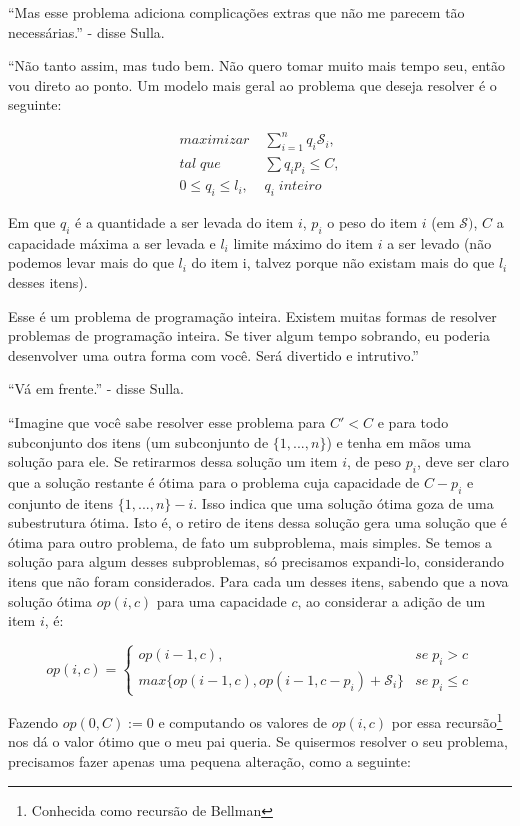 \documentclass{article}
\begin{document}
``Mas esse problema adiciona complicações extras que não me parecem tão necessárias.'' - disse
Sulla.

``Não tanto assim, mas tudo bem. Não quero tomar muito mais tempo seu, então vou direto ao ponto. Um
modelo mais geral ao problema que deseja resolver é o seguinte:

\begin{align*}
  maximizar \;& \sum\limits_{i=1}^n q_i \mathscr{S}_i,\\
  tal\; que\;& \sum{q_i p_i} \leq C,\\
  0 \leq q_i \leq l_i,\; & q_i \; inteiro
\end{align*}

Em que $q_i$ é a quantidade a ser levada do item $i$, $p_i$ o peso do item $i$ (em
$\mathscr{S})$, $C$ a capacidade máxima a ser levada e $l_i$ limite máximo do item $i$ a ser
levado (não podemos levar mais do que $l_i$ do item i, talvez porque não existam mais do que $l_i$
desses itens).

Esse é um problema de programação inteira. Existem muitas formas de resolver problemas de
programação inteira. Se tiver algum tempo sobrando, eu poderia desenvolver uma outra forma com
você. Será divertido e intrutivo.''

``Vá em frente.'' - disse Sulla.

``Imagine que você sabe resolver esse problema para $C' < C$ e para todo subconjunto dos itens (um
subconjunto de $\{1, ..., n\}$) e tenha em mãos uma solução para ele. Se retirarmos dessa solução um item $i$, de peso $p_i$, deve ser
claro que a solução restante é ótima para o problema cuja capacidade de $C - p_i$ e conjunto de
itens $\{1, ..., n\}-i$. Isso indica que uma solução ótima goza de uma subestrutura ótima. Isto é, o
retiro de itens dessa solução gera uma solução que é ótima para outro problema, de fato um
subproblema, mais simples. Se temos a solução para algum desses subproblemas, só precisamos
expandi-lo, considerando itens que não foram considerados. Para cada um desses itens, sabendo que a
nova solução ótima $op(i,c)$ para uma capacidade $c$, ao considerar a adição de um item $i$, é:

\[
  op(i,c) =
  \begin{cases}
    op(i-1, c),  & se\; p_i > c\\
    max\{op(i-1, c), op(i-1, c-p_i) + \mathscr{S}_i\} & se\; p_i \leq c
  \end{cases}
\]

Fazendo $op(0, C) := 0$ e computando os valores de $op(i, c)$ por essa recursão\footnote{Conhecida
como recursão de Bellman} nos dá o valor ótimo que o meu pai queria. Se quisermos resolver o seu
problema, precisamos fazer apenas uma pequena alteração, como a seguinte:
\end{document}

